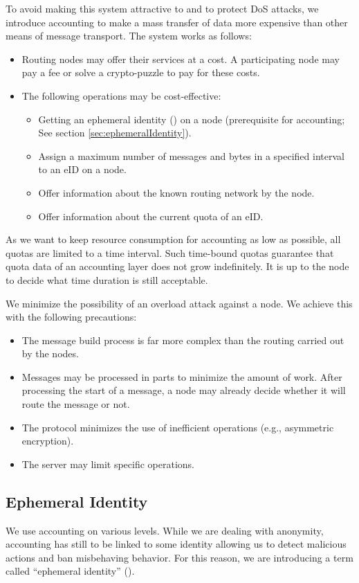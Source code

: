 To avoid making this system attractive to  and to protect DoS attacks, we introduce accounting to make a mass transfer of data more expensive than other means of message transport. The system works as follows:
\begin{itemize}
	\item Routing nodes may offer their services at a cost. A participating node may pay a fee or solve a crypto-puzzle to pay for these costs.
	\item The following operations may be cost-effective:
	\begin{itemize}
		\item Getting an ephemeral identity () on a node (prerequisite for accounting; See section \ref{sec:ephemeralIdentity}).
		\item Assign a maximum number of messages and bytes in a specified interval to an eID on a node.
		\item Offer information about the known routing network by the node.
		\item Offer information about the current quota of an eID.
	\end{itemize}
\end{itemize}
As we want to keep resource consumption for accounting as low as possible, all quotas are limited to a time interval. Such time-bound quotas guarantee that quota data of an accounting layer does not grow indefinitely. It is up to the node to decide what time duration is still acceptable.

We minimize the possibility of an overload attack against a node. We achieve this with the following precautions:
\begin{itemize}
	\item The message build process is far more complex than the routing carried out by the nodes.
	\item Messages may be processed in parts to minimize the amount of work. After processing the start of a message, a node may already decide whether it will route the message or not.
	\item The protocol minimizes the use of inefficient operations (e.g., asymmetric encryption).
	\item The server may limit specific operations.
\end{itemize}

\subsection{Ephemeral Identity\label{sec:ephemeralIdentity}}
We use accounting on various levels. While we are dealing with anonymity, accounting has still to be linked to some identity allowing us to detect malicious actions and ban misbehaving behavior. For this reason, we are introducing a term called ``ephemeral identity'' ().

